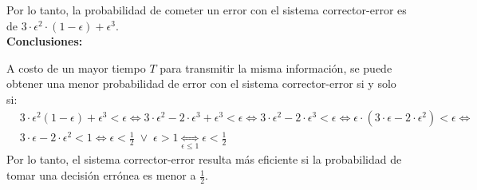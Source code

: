 \documentclass[11pt]{article}
\begin{document}
Por lo tanto, la probabilidad de cometer un error con el sistema corrector-error
es de \newline $ 3 \cdot \epsilon^2 \cdot (1 - \epsilon) + \epsilon^3 $. \\


\textbf{Conclusiones:} 

A costo de un mayor tiempo $T$ para transmitir la misma información, se puede 
obtener una menor probabilidad de error con el sistema corrector-error si y solo si:
\begin{align*}
  & 3\cdot\epsilon^2(1-\epsilon) + \epsilon^3 < \epsilon \iff 3\cdot\epsilon^2 -
  2\cdot\epsilon^3 + \epsilon^3 < \epsilon \iff 3\cdot\epsilon^2 - 
  2\cdot\epsilon^3 < \epsilon \iff \epsilon\cdot(3\cdot\epsilon-2\cdot\epsilon^2) <
  \epsilon \iff \\
  & 3\cdot\epsilon-2\cdot\epsilon^2 < 1 \iff \epsilon < \frac{1}{2} \;\lor\; \epsilon > 1
  \underset{\epsilon \leq 1}{\iff} \epsilon < \frac{1}{2}
\end{align*}
Por lo tanto, el sistema corrector-error resulta más eficiente si la probabilidad
de tomar una decisión errónea es menor a $\frac{1}{2}$.
\end{document}
